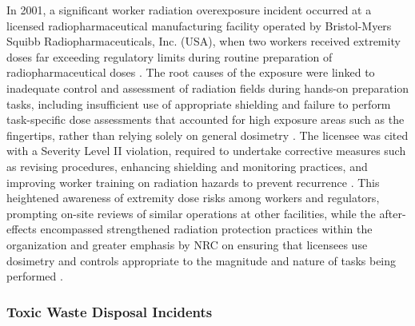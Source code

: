 In 2001, a significant worker radiation overexposure incident occurred at a licensed radiopharmaceutical manufacturing facility operated by Bristol-Myers Squibb Radiopharmaceuticals, Inc. (USA), when two workers received extremity doses far exceeding regulatory limits during routine preparation of radiopharmaceutical doses \cite{NRC_EA02160}. The root causes of the exposure were linked to inadequate control and assessment of radiation fields during hands-on preparation tasks, including insufficient use of appropriate shielding and failure to perform task-specific dose assessments that accounted for high exposure areas such as the fingertips, rather than relying solely on general dosimetry \cite{NRC_EA02160}. The licensee was cited with a Severity Level II violation, required to undertake corrective measures such as revising procedures, enhancing shielding and monitoring practices, and improving worker training on radiation hazards to prevent recurrence \cite{NRC_EA02160}. This heightened awareness of extremity dose risks among workers and regulators, prompting on-site reviews of similar operations at other facilities, while the after-effects encompassed strengthened radiation protection practices within the organization and greater emphasis by NRC on ensuring that licensees use dosimetry and controls appropriate to the magnitude and nature of tasks being performed \cite{NRC_EA02160}.

\subsubsection{Toxic Waste Disposal Incidents}

